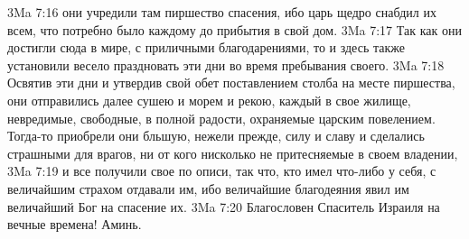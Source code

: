 \vs 3Ma 7:16 они учредили там пиршество спасения, ибо царь щедро снабдил их всем, что потребно было каждому до прибытия в свой дом.
\vs 3Ma 7:17 Так как они достигли сюда в мире, с приличными благодарениями, то и здесь также установили весело праздновать эти дни во время пребывания своего.
\vs 3Ma 7:18 Освятив эти дни и утвердив свой обет поставлением столба на месте пиршества, они отправились далее сушею и морем и рекою, каждый в свое жилище, невредимые, свободные, в полной радости, охраняемые царским повелением. Тогда-то приобрели они бльшую, нежели прежде, силу и славу и сделались страшными для врагов, ни от кого нисколько не притесняемые в своем владении,
\vs 3Ma 7:19 и все получили свое по описи, так что, кто имел что-либо у себя, с величайшим страхом отдавали им, ибо величайшие благодеяния явил им величайший Бог на спасение их.
\vs 3Ma 7:20 Благословен Спаситель Израиля на вечные времена! Аминь.
